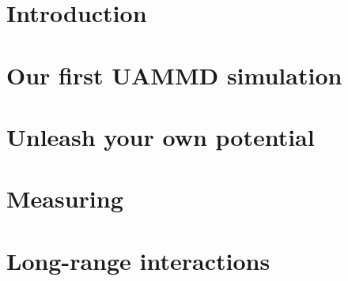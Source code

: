 \documentclass[a4paper,12pt,openany,hidelinks]{book}
\begin{document}

\tableofcontents

\chapter*{Introduction}



\chapter{Our first UAMMD simulation}



\chapter{Unleash your own potential}



\chapter{Measuring}



\chapter{Long-range interactions}

\end{document}
